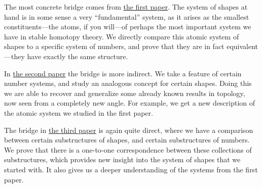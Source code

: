 The most concrete bridge comes from {\hyperref[ch1]{the first paper}}. The system of shapes at hand is in some sense a very ``fundamental'' system, as it arises as the smallest constituents---the atoms, if you will---of perhaps the most important system we have in stable homotopy theory. We directly compare this atomic system of shapes to a specific system of numbers, and prove that they are in fact equivalent---they have exactly the same structure. 

In {\hyperref[ch2]{the second paper}} the bridge is more indirect. We take a feature of certain number systems, and study an analogous concept for certain shapes. Doing this we are able to recover and generalize some already known results in topology, now seen from a completely new angle. For example, we get a new description of the atomic system we studied in the first paper. 

The bridge in {\hyperref[ch3]{the third paper}} is again quite direct, where we have a comparison between certain substructures of shapes, and certain substructures of numbers. We prove that there is a one-to-one correspondence between these collections of substructures, which provides new insight into the system of shapes that we started with. It also gives us a deeper understanding of the systems from the first paper. 
  